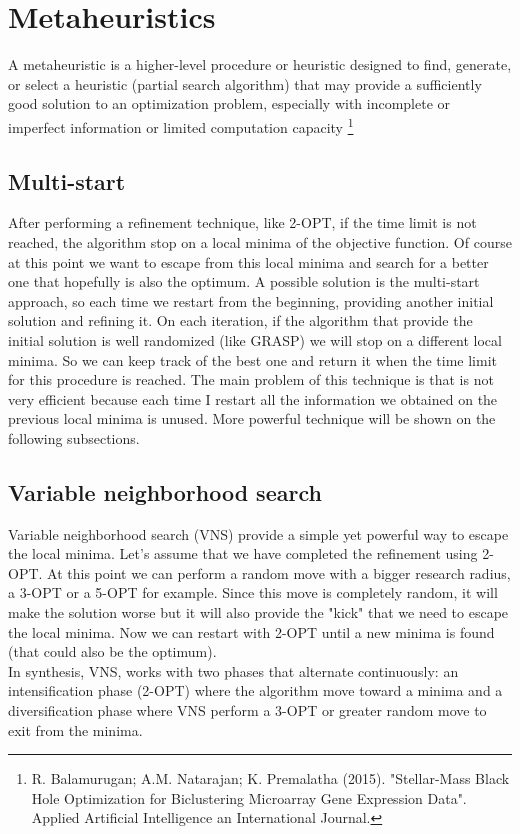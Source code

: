 \section{Metaheuristics}
A metaheuristic is a higher-level procedure or heuristic designed to find, generate, or select a heuristic (partial search algorithm) that may provide a sufficiently good solution to an optimization problem, especially with incomplete or imperfect information or limited computation capacity \footnote{R. Balamurugan; A.M. Natarajan; K. Premalatha (2015). "Stellar-Mass Black Hole Optimization for Biclustering Microarray Gene Expression Data". Applied Artificial Intelligence an International Journal.}


\subsection{Multi-start}
After performing a refinement technique, like 2-OPT, if the time limit is not reached, the algorithm stop on a local minima of the objective function. Of course at this point we want to escape from this local minima and search for a better one that hopefully is also the optimum. A possible solution is the multi-start approach, so each time we restart from the beginning, providing another initial solution and refining it. On each iteration, if the algorithm that provide the initial solution is well randomized (like GRASP) we will stop on a different local minima. So we can keep track of the best one and return it when the time limit for this procedure is reached.
The main problem of this technique is that is not very efficient because each time I restart all the information we obtained on the previous local minima is unused.
More powerful technique will be shown on the following subsections.

\subsection{Variable neighborhood search}
Variable neighborhood search (VNS) provide a simple yet powerful way to escape the local minima. Let's assume that we have completed the refinement using 2-OPT. At this point we can perform a random move with a bigger research radius, a 3-OPT or a 5-OPT for example. Since this move is completely random, it will make the solution worse but it will also provide the "kick" that we need to escape the local minima. Now we can restart with 2-OPT until a new minima is found (that could also be the optimum).\\
In synthesis, VNS, works with two phases that alternate continuously: an intensification  phase (2-OPT) where the algorithm move toward a minima and a diversification phase where VNS perform a 3-OPT or greater random move to exit from the minima.

